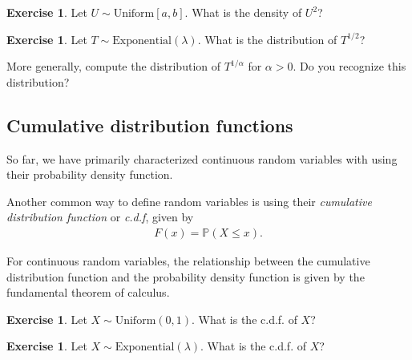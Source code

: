 \documentclass[11pt]{article}
\theoremstyle{definition}
\newtheorem{exercise}[]{Exercise}
\renewcommand{\P}{\mathbb{P}}
\begin{document}
\begin{exercise}
Let $U\sim \text{Uniform}[a, b]$. What is the density of $U^2$?
\end{exercise}


\begin{exercise}
Let $T \sim \text{Exponential}(\lambda)$. What is the distribution of
$T^{1/2}$?

More generally, compute the distribution of $T^{1/\alpha}$ for $\alpha > 0$.
Do you recognize this distribution?

\end{exercise}

\subsection{Cumulative distribution functions}

So far, we have primarily characterized continuous random
variables with using their probability density function.

Another common way to define random variables is using
their \textit{cumulative distribution function} or
\textit{c.d.f}, given by
\begin{align}
  F(x) = \P(X \leq x).
  \label{eq:cdf}
\end{align}

For continuous random variables,
the relationship between the cumulative distribution
function and the probability density function is given
by the fundamental theorem of calculus.


\begin{exercise} Let $X\sim \text{Uniform}(0, 1)$.
  What is the c.d.f. of $X$?
\end{exercise}

\begin{exercise} Let $X\sim \text{Exponential}(\lambda)$.
  What is the c.d.f. of $X$?
\end{exercise}
\end{document}

